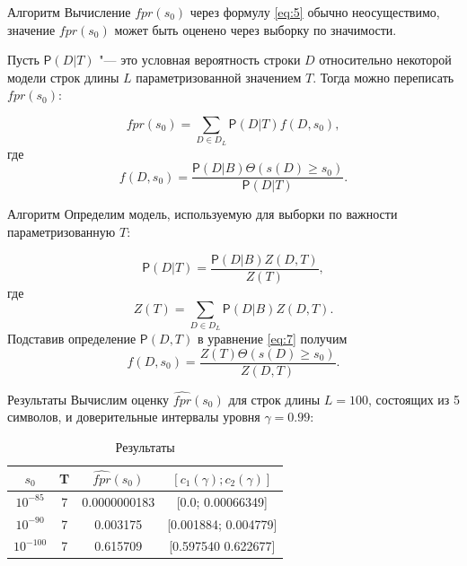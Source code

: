 \documentclass{beamer}
\begin{document}
	\begin{frame}{Алгоритм}
		Вычисление $fpr(s_{0})$ через формулу \eqref{eq:5} обычно неосуществимо, значение $fpr(s_{0})$ может быть оценено через выборку по значимости. 
		
		\vspace{0.5cm}
		
		Пусть $\mathsf{P}(D|T)$ "--- это условная вероятность строки $D$ относительно некоторой модели строк длины $L$ параметризованной значением $T$. Тогда можно переписать $fpr(s_{0})$:		
		
		\begin{equation*}
			fpr(s_{0}) = \sum_{D \in D_{L}} \mathsf{P}(D|T) f(D,s_{0}), \label{eq:6}
		\end{equation*}
		где
		\begin{equation}
			f(D,s_{0}) = \frac{\mathsf{P}(D|B) \Theta(s(D) \geq s_{0})}{\mathsf{P}(D|T)}. \label{eq:7}
		\end{equation}				
	\end{frame}

	\begin{frame}{Алгоритм}
		Определим модель, используемую для выборки по важности параметризованную $T$:		
		
		\begin{equation*}
			\mathsf{P}(D|T) = \frac{\mathsf{P}(D|B)Z(D,T)}{Z(T)}, \label{eq:8}
		\end{equation*}							
		где 
		\begin{equation*}
			Z(T) = \sum_{D \in D_{L}}\mathsf{P}(D|B)Z(D,T). \label{eq:9}
		\end{equation*}
		Подставив определение $\mathsf{P}(D,T)$ в уравнение \eqref{eq:7} получим
		\begin{equation*}
			f(D,s_{0}) = \frac{Z(T)\Theta(s(D) \geq s_{0})}{Z(D,T)}. \label{eq:10}
		\end{equation*}	
	\end{frame}

	\begin{frame}{Результаты}
		Вычислим оценку $\widehat{fpr}(s_{0})$ для строк длины $L=100$, состоящих из 5 символов, и доверительные интервалы уровня $\gamma = 0.99$:		
		\begin{table}
			\caption{Результаты} \label{tb:1}
			\begin{tabular}{cccc}
				$s_{0}$&T&$\widehat{fpr}(s_{0})$&$[c_{1}(\gamma);c_{2}(\gamma)]$  \\ \hline
				$10^{-85}$&7&0.0000000183&[0.0; 0.00066349] \\
				$10^{-90}$&7&0.003175&[0.001884; 0.004779] \\ 
				$10^{-100}$&7&0.615709&[0.597540 0.622677] \\
			\end{tabular}
		\end{table}								
	\end{frame}
\end{document}
